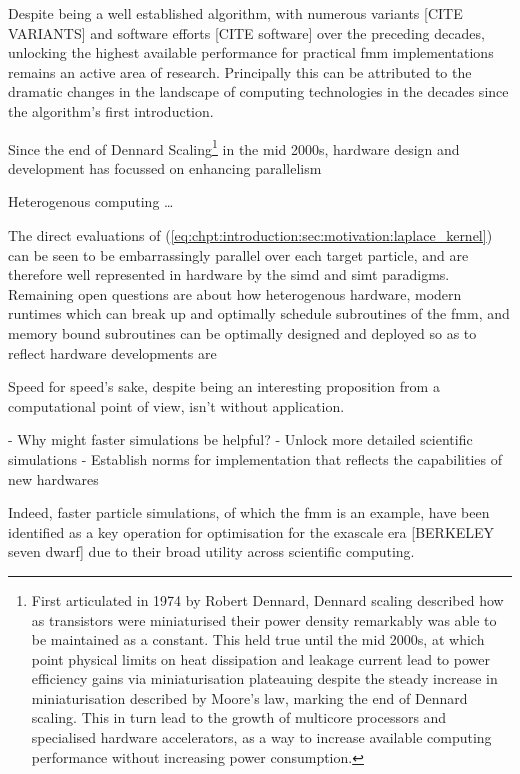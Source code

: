 Despite being a well established algorithm, with numerous variants [CITE VARIANTS] and software efforts [CITE software] over the preceding decades, unlocking the highest available performance for practical \acrshort{fmm} implementations remains an active area of research. Principally this can be attributed to the dramatic changes in the landscape of computing technologies in the decades since the algorithm's first introduction.

Since the end of Dennard Scaling\footnote{First articulated in 1974 by Robert Dennard, Dennard scaling described how as transistors were miniaturised their power density remarkably was able to be maintained as a constant. This held true until the mid 2000s, at which point physical limits on heat dissipation and leakage current lead to power efficiency gains via miniaturisation plateauing despite the steady increase in miniaturisation described by Moore's law, marking the end of Dennard scaling. This in turn lead to the growth of multicore processors and specialised hardware accelerators, as a way to increase available computing performance without increasing power consumption.} in the mid 2000s, hardware design and development has focussed on enhancing parallelism


Heterogenous computing \dots

The direct evaluations of (\ref{eq:chpt:introduction:sec:motivation:laplace_kernel}) can be seen to be embarrassingly parallel over each target particle, and are therefore well represented in hardware by the \acrshort{simd} and \acrshort{simt} paradigms. Remaining open questions are about how heterogenous hardware, modern runtimes which can break up and optimally schedule subroutines of the \acrshort{fmm}, and memory bound subroutines can be optimally designed and deployed so as to reflect hardware developments are


Speed for speed's sake, despite being an interesting proposition from a computational point of view, isn't without application.

- Why might faster simulations be helpful?
    - Unlock more detailed scientific simulations
    - Establish norms for implementation that reflects the capabilities of new hardwares

Indeed, faster particle simulations, of which the \acrshort{fmm} is an example, have been identified as a key operation for optimisation for the exascale era [BERKELEY seven dwarf] due to their broad utility across scientific computing.


